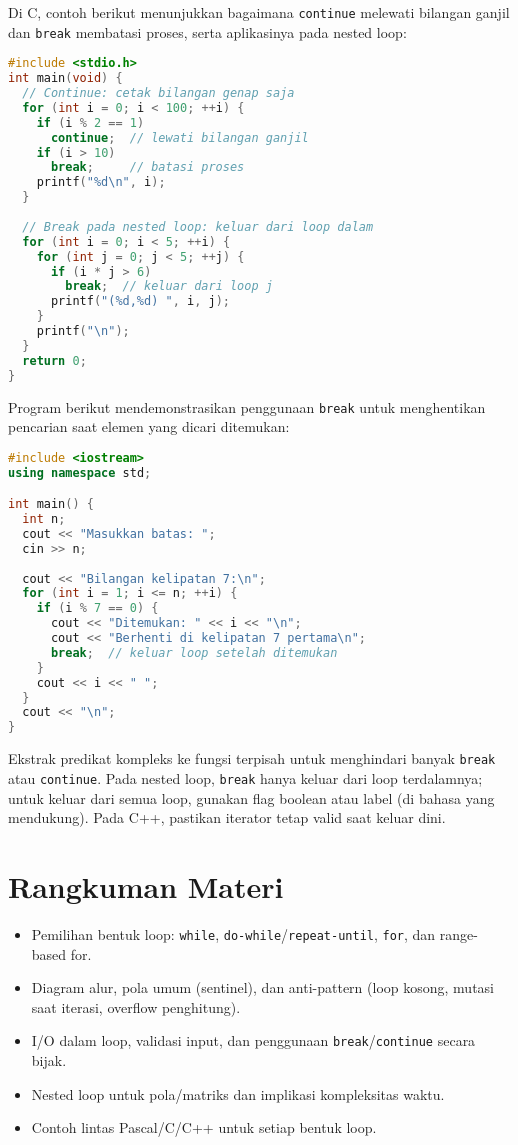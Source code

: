 \documentclass[../main.tex]{subfiles}
\begin{document}
Di C, contoh berikut menunjukkan bagaimana \texttt{continue} melewati bilangan ganjil dan \texttt{break} membatasi proses, serta aplikasinya pada nested loop:

\begin{lstlisting}[language=C, caption={break dan continue di C}]
#include <stdio.h>
int main(void) {
  // Continue: cetak bilangan genap saja
  for (int i = 0; i < 100; ++i) {
    if (i % 2 == 1)
      continue;  // lewati bilangan ganjil
    if (i > 10)
      break;     // batasi proses
    printf("%d\n", i);
  }
  
  // Break pada nested loop: keluar dari loop dalam
  for (int i = 0; i < 5; ++i) {
    for (int j = 0; j < 5; ++j) {
      if (i * j > 6)
        break;  // keluar dari loop j
      printf("(%d,%d) ", i, j);
    }
    printf("\n");
  }
  return 0;
}
\end{lstlisting}

Program berikut mendemonstrasikan penggunaan \texttt{break} untuk menghentikan pencarian saat elemen yang dicari ditemukan:

\begin{lstlisting}[language=C++, caption={break saat menemukan kondisi (C++)}]
#include <iostream>
using namespace std;

int main() {
  int n;
  cout << "Masukkan batas: ";
  cin >> n;
  
  cout << "Bilangan kelipatan 7:\n";
  for (int i = 1; i <= n; ++i) {
    if (i % 7 == 0) {
      cout << "Ditemukan: " << i << "\n";
      cout << "Berhenti di kelipatan 7 pertama\n";
      break;  // keluar loop setelah ditemukan
    }
    cout << i << " ";
  }
  cout << "\n";
}
\end{lstlisting}

Ekstrak predikat kompleks ke fungsi terpisah untuk menghindari banyak \texttt{break} atau \texttt{continue}. Pada nested loop, \texttt{break} hanya keluar dari loop terdalamnya; untuk keluar dari semua loop, gunakan flag boolean atau label (di bahasa yang mendukung). Pada C++, pastikan iterator tetap valid saat keluar dini.
\section{Rangkuman Materi}
\begin{itemize}
  \item Pemilihan bentuk loop: \texttt{while}, \texttt{do-while}/\texttt{repeat-until}, \texttt{for}, dan range-based for.
  \item Diagram alur, pola umum (sentinel), dan anti-pattern (loop kosong, mutasi saat iterasi, overflow penghitung).
  \item I/O dalam loop, validasi input, dan penggunaan \texttt{break}/\texttt{continue} secara bijak.
  \item Nested loop untuk pola/matriks dan implikasi kompleksitas waktu.
  \item Contoh lintas Pascal/C/C++ untuk setiap bentuk loop.
\end{itemize}
\end{document}
